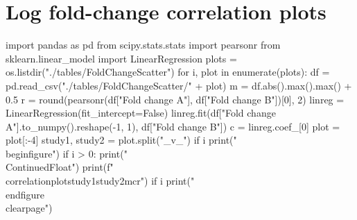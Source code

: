 \section{Log fold-change correlation plots}

\newcommand{\correlationplot}[5]{\begin{subfigure}[b]{0.5\textwidth}
    \resizebox{\textwidth}{!}{
    \begin{tikzpicture}
    \begin{axis}[
        name=boundry,
        x label style={at={(0.5,-0.1)},anchor=north},
        y label style={at={(-0.1,.5)},rotate=90,anchor=south},
        axis lines=middle,
        xmin=-#3,
        xmax=#3,
        ymin=-#3,
        ymax=#3
    ]
    \addplot[
        scatter,only marks,
        table/col sep=comma,
        mark size=1pt,
        scatter/use mapped color={draw=red, fill=red}
    ]
    table[x={Fold change A},y={Fold change B}]{tables/FoldChangeScatter/#1_v_#2.csv};
    \addplot+[blue,no marks,line width=2.0pt]{#4 * x};
    \end{axis}
    \node[draw, anchor=north east] at (boundry.north east) {$r = #5$};
    \end{tikzpicture}}
    \caption{Log fold-change correlation between \citet{#1} and \citet{#2}}
    \label{fig:correlation_#1_#2}
    \end{subfigure}
}

\begin{pycode}
import pandas as pd
from scipy.stats.stats import pearsonr
from sklearn.linear_model import LinearRegression
plots = os.listdir("./tables/FoldChangeScatter")
for i, plot in enumerate(plots):
    df = pd.read_csv("./tables/FoldChangeScatter/" + plot)
    m = df.abs().max().max() + 0.5
    r = round(pearsonr(df["Fold change A"], df["Fold change B"])[0], 2)
    linreg = LinearRegression(fit_intercept=False)
    linreg.fit(df["Fold change A"].to_numpy().reshape(-1, 1), df["Fold change B"])
    c = linreg.coef_[0]
    plot = plot[:-4]
    study1, study2 = plot.split("_v_")
    if i %
        print("\\begin{figure}")
        if i > 0:
            print("\\ContinuedFloat")
    print(f"\\correlationplot{{{study1}}}{{{study2}}}{{{m}}}{{{c}}}{{{r}}}")
    if i %
        print("\\end{figure}\\clearpage")
\end{pycode}
